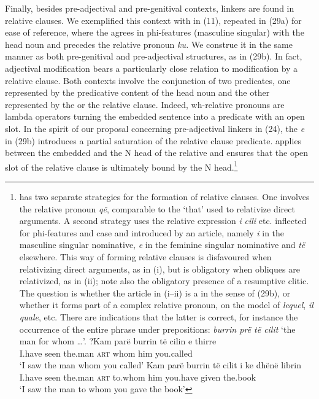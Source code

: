 \documentclass[output=paper]{langsci/langscibook}
\begin{document}
Finally, besides pre-ad\-jec\-ti\-val and pre-genitival contexts, linkers are found in relative clauses. We exemplified this context with   in (11), repeated in (29a) for ease of reference, where the  agrees in phi-features (masculine singular) with the head noun and precedes the relative pronoun \textit{ku.} We construe it in the same manner as both pre-genitival and pre-ad\-jec\-ti\-val  structures, as in (29b). In fact, adjectival modification bears a particularly close relation to modification by a relative clause. Both contexts involve the conjunction of two predicates, one represented by the predicative content of the head noun and the other represented by the  or the relative clause. Indeed, wh-relative pronouns are lambda operators turning the embedded sentence into a predicate with an open slot. In the spirit of our proposal concerning pre-ad\-jec\-ti\-val linkers in (24), the  \textit{e} in (29b) introduces a partial saturation of the relative clause predicate.  applies between the embedded  and the N head of the relative and ensures that the open slot of the relative clause is ultimately bound by the N head.\footnote{ has two separate strategies for the formation of relative clauses. One involves the relative pronoun \textit{që}, comparable to the  ‘that’ used to relativize direct arguments. A second strategy uses the relative expression \textit{i} \textit{cili} etc. inflected for phi-features and case and introduced by an article, namely \textit{i} in the masculine singular nominative, \textit{e} in the feminine singular nominative and \textit{të} elsewhere. This way of forming relative clauses is disfavoured when relativizing direct arguments, as in (i), but is obligatory when obliques are relativized, as in (ii); note also the obligatory presence of a resumptive clitic. The question is whether the article in (i--ii) is a  in the sense of (29b), or whether it forms part of a complex relative pronoun, on the model of  \textit{lequel},  \textit{il quale}, etc. There are indications that the latter is correct, for instance the occurrence of the entire phrase under prepositions: \textit{burrin prë të cilit} ‘the man for whom …’.
  \ea   \gll    ?Kam  parë   burrin   të   cilin   e   thirre\\
                I.have   seen   the.man  \textsc{art}   whom  him   you.called\\
  \glt  ‘I saw the man whom you called’
  \z
  \ea   \gll    Kam  parë   burrin   të   cilit     i   ke     dhënë   librin\\
                I.have   seen  the.man  \textsc{art}   to.whom    him   you.have   given   the.book\\
        \glt    ‘I saw the man to whom you gave the book’
\z}\newpage
\end{document}
